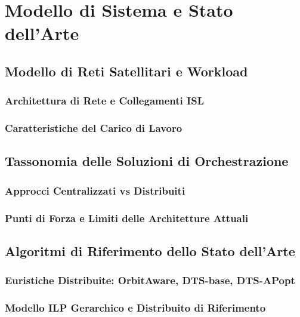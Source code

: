 \chapter{Modello di Sistema e Stato dell'Arte}
\label{chap:stato_arte}

\section{Modello di Reti Satellitari e Workload}
\subsection{Architettura di Rete e Collegamenti ISL}
\subsection{Caratteristiche del Carico di Lavoro}

\section{Tassonomia delle Soluzioni di Orchestrazione}
\subsection{Approcci Centralizzati vs Distribuiti}
\subsection{Punti di Forza e Limiti delle Architetture Attuali}

\section{Algoritmi di Riferimento dello Stato dell'Arte}
\subsection{Euristiche Distribuite: OrbitAware, DTS-base, DTS-APopt}
\subsection{Modello ILP Gerarchico e Distribuito di Riferimento}